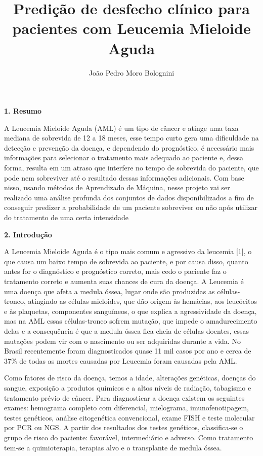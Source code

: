\documentclass{article}
\title{Predição de desfecho clínico para pacientes com Leucemia Mieloide Aguda}
\author{João Pedro Moro Bolognini}
\date{} %
\begin{document}
\maketitle

\begin{multicols}{2}

\textbf{1. Resumo}

A Leucemia Mieloide Aguda (AML) é um tipo de câncer e atinge uma taxa mediana de sobrevida de 12 a 18 meses, esse tempo curto gera uma dificuldade na detecção e prevenção da doença, e dependendo do prognóstico, é necessário mais informações para selecionar o tratamento mais adequado ao paciente e, dessa forma, resulta em um atraso que interfere no tempo de sobrevida do paciente, que pode nem sobreviver até o resultado dessas informações adicionais. Com base nisso, usando métodos de Aprendizado de Máquina, nesse projeto vai ser realizado uma análise profunda dos conjuntos de dados disponibilizados a fim de conseguir predizer a probabilidade de um paciente sobreviver ou não após utilizar do tratamento de uma certa intensidade 

\textbf{2. Introdução}

A Leucemia Mieloide Aguda é o tipo mais comum e agressivo da leucemia [1], o que causa um baixo tempo de sobrevida ao paciente, e por causa disso, quanto antes for o diagnóstico e prognóstico correto, mais cedo o paciente faz o tratamento correto e aumenta suas chances de cura da doença. A Leucemia é uma doença que afeta a medula óssea, lugar onde são produzidas as células-tronco, atingindo as células mieloides, que dão origem às hemácias, aos leucócitos e às plaquetas, componentes sanguíneos, o que explica a agressividade da doença, mas na AML essas células-tronco sofrem mutação, que impede o amadurecimento delas e a consequência é que a medula óssea fica cheia de células doentes, essas mutações podem vir com o nascimento ou ser adquiridas durante a vida. 
No Brasil recentemente foram diagnosticados quase 11 mil casos por ano e cerca de 37\% de todas as mortes causadas por Leucemia foram causadas pela AML.

Como fatores de risco da doença, temos a idade, alterações genéticas, doenças do sangue, exposição a produtos químicos e a altos níveis de radiação, tabagismo e tratamento prévio de câncer.
Para diagnosticar a doença existem os seguintes exames: hemograma completo com diferencial, mielograma, imunofenotipagem, testes genéticos, análise citogenética convencional, exame FISH e teste molecular por PCR ou NGS. A partir dos resultados dos testes genéticos, classifica-se o grupo de risco do paciente: favorável, intermediário e adverso.
Como tratamento tem-se a quimioterapia, terapias alvo e o transplante de medula óssea.


\end{multicols}
\end{document}
